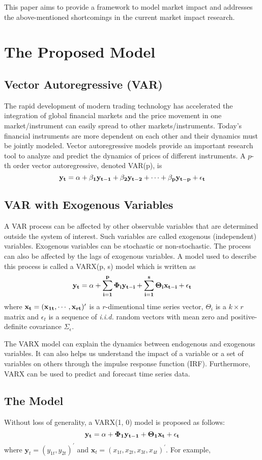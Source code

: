 \documentclass[a4paper]{article}
\begin{document}
This paper aims to provide a framework to model market impact and addresses the above-mentioned shortcomings in the current market impact research.

\section{The Proposed Model}
\subsection{Vector Autoregressive (VAR)}
The rapid development of modern trading technology has accelerated the integration of global financial markets and the price movement in one market/instrument can easily spread to other markets/instruments. Today's financial instruments are more dependent on each other and their dynamics must be jointly modeled. Vector autoregressive models provide an important research tool to analyze and predict the dynamics of prices of different instruments. A $p$-th order vector autoregressive, denoted VAR(p), is 
$$
\bf y_{t}=\alpha + \beta_{1}y_{t-1} + \beta_{2}y_{t-2}+\cdots + \beta_{p}y_{t-p}+\epsilon_{t}
$$

\subsection{VAR with Exogenous Variables}
A VAR process can be affected by other observable variables that are determined outside the system of interest. Such variables are called exogenous (independent) variables. Exogenous variables can be stochastic or non-stochastic. The process can also be affected by the lags of exogenous variables. A model used to describe this process is called a VARX(p, s) model which is written as $$\bf y_t = \alpha + \sum_{i=1}^{p} \Phi_i y_{t-i} + \sum_{i=1}^{s} \Theta_i x_{t-i} + \epsilon_{t}$$ where $\bf x_t = (x_{1t},\cdots,x_{rt})^\prime$ is a $r$-dimentional time series vector, $\Theta_i$ is a $k \times r$ matrix and $\epsilon_{t}$ is a sequence of \emph{i.i.d.} random vectors with mean zero and positive-definite covariance $\Sigma_{\epsilon}$.

The VARX model can explain the dynamics between endogenous and exogenous variables. It can also helps us understand the impact of a variable or a set of variables on others through the impulse response function (IRF). Furthermore, VARX can be used to predict and forecast time series data.

\subsection{The Model}
Without loss of generality, a VARX(1, 0) model is proposed as follows:
$$
\bf y_t = \alpha + \Phi_1 y_{t-1} + \Theta_1 x_t +\epsilon_{t}
$$
where $\textbf{y}_t = (y_{1t}, y_{2t})^\prime$ and $\textbf{x}_t = (x_{1t}, x_{2t}, x_{3t}, x_{4t})^\prime$. For example,
\end{document}
